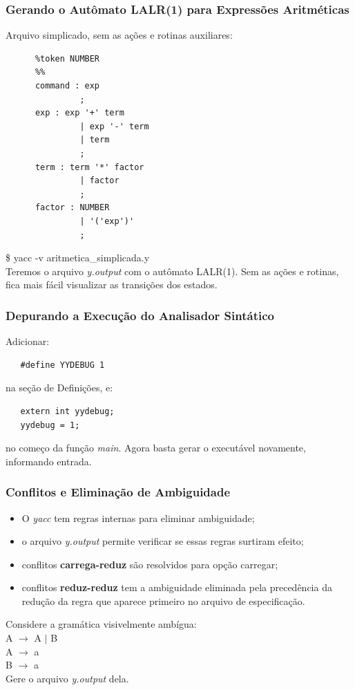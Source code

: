 \documentclass[table]{beamer}
\begin{document}
\begin{frame} [fragile]
   \frametitle{Gerando o Autômato LALR(1) para Expressões Aritméticas}
   Arquivo simplicado, sem as ações e rotinas auxiliares:
   \scriptsize
   \begin{verbatim}
      %token NUMBER
      %% 
      command : exp
               ; 
      exp : exp '+' term 
               | exp '-' term 
               | term 
               ;
      term : term '*' factor 
               | factor 
               ;      
      factor : NUMBER 
               | '('exp')' 
               ;  
   \end{verbatim}
   \normalsize
   \$ yacc -v aritmetica\_simplicada.y \\
   Teremos o arquivo \textit{y.output} com o autômato LALR(1). Sem as ações e rotinas, fica mais fácil visualizar as transições dos estados.
\end{frame}

\begin{frame}[fragile]
   \frametitle{Depurando a Execução do Analisador Sintático}
   Adicionar:
   \begin{verbatim}
   #define YYDEBUG 1
   \end{verbatim}
   na seção de Definições, e:
   \begin{verbatim}
   extern int yydebug;
   yydebug = 1;
   \end{verbatim}
   no começo da função \textit{main}. Agora basta gerar o executável novamente, informando entrada. 
\end{frame}

\begin{frame}
   \frametitle{Conflitos e Eliminação de Ambiguidade}
   \begin{itemize}
      \item O \textit{yacc} tem regras internas para eliminar ambiguidade;
      \item o arquivo \textit{y.output} permite verificar se essas regras surtiram efeito;
      \item conflitos \textbf{carrega-reduz} são resolvidos para opção carregar;
      \item conflitos \textbf{reduz-reduz} tem a ambiguidade eliminada pela precedência da redução da regra que aparece primeiro no arquivo de especificação.
   \end{itemize}
   Considere a gramática visivelmente ambígua: \\
   A $\rightarrow$ A $|$ B \\
   A $\rightarrow$ a \\
   B $\rightarrow$ a \\
   Gere o arquivo \textit{y.output} dela.
\end{frame}
\end{document}
